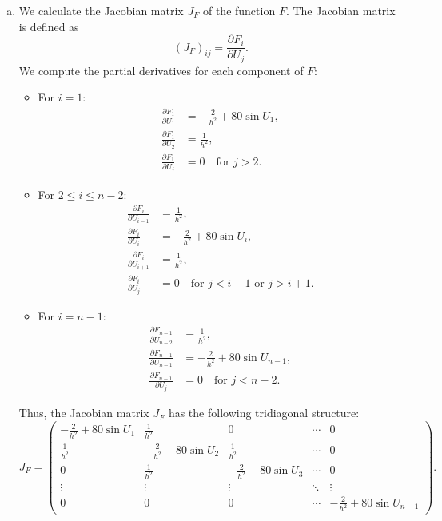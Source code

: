 \documentclass{article}
\begin{document}
\begin{enumerate}[(a)]
  \item We calculate the Jacobian matrix $J_F$ of the function $F$. The Jacobian matrix is defined as
        \begin{equation*}
          (J_F)_{ij} = \frac{\partial F_i}{\partial U_j}.
        \end{equation*}
        We compute the partial derivatives for each component of $F$:
        \begin{itemize}
          \item For $i=1$:
                \begin{align*}
                  \frac{\partial F_1}{\partial U_1} & = -\frac{2}{h^2} + 80 \sin U_1, \\
                  \frac{\partial F_1}{\partial U_2} & = \frac{1}{h^2}, \\
                  \frac{\partial F_1}{\partial U_j} & = 0 \quad \text{for } j > 2.
                \end{align*}
          \item For $2 \leq i \leq n-2$:
                \begin{align*}
                  \frac{\partial F_i}{\partial U_{i-1}} & = \frac{1}{h^2}, \\
                  \frac{\partial F_i}{\partial U_i} & = -\frac{2}{h^2} + 80 \sin U_i, \\
                  \frac{\partial F_i}{\partial U_{i+1}} & = \frac{1}{h^2}, \\
                  \frac{\partial F_i}{\partial U_j} & = 0 \quad \text{for } j < i-1 \text{ or } j > i+1.
                \end{align*}
          \item For $i=n-1$:
                \begin{align*}
                  \frac{\partial F_{n-1}}{\partial U_{n-2}} & = \frac{1}{h^2}, \\
                  \frac{\partial F_{n-1}}{\partial U_{n-1}} & = -\frac{2}{h^2} + 80 \sin U_{n-1}, \\
                  \frac{\partial F_{n-1}}{\partial U_j} & = 0 \quad \text{for } j < n-2.
                \end{align*}
        \end{itemize}
        Thus, the Jacobian matrix $J_F$ has the following tridiagonal structure:
        \begin{equation*}
          J_F = \begin{pmatrix}
            -\frac{2}{h^2} + 80 \sin U_1 & \frac{1}{h^2} & 0 & \cdots & 0 \\
            \frac{1}{h^2} & -\frac{2}{h^2} + 80 \sin U_2 & \frac{1}{h^2} & \cdots & 0 \\
            0 & \frac{1}{h^2} & -\frac{2}{h^2} + 80 \sin U_3 & \cdots & 0 \\
            \vdots & \vdots & \vdots & \ddots & \vdots \\
            0 & 0 & 0 & \cdots & -\frac{2}{h^2} + 80 \sin U_{n-1}
          \end{pmatrix}.
        \end{equation*}
\end{enumerate}
\end{document}
